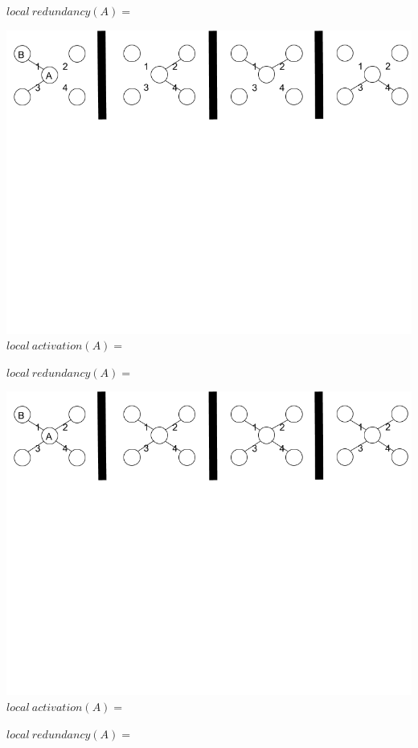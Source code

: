 \documentclass[oneside,12pt]{Classes/RoboticsLaTeX}
\begin{document}
\begin{appendices}
\begin{center}
$local\ redundancy(A) =$
\end{center}
\begin{center}
\includegraphics[trim={0 15cm 0 0}, width=140mm]{./Figures/volatilityAppendix3.png}
$local\ activation(A) =$

$local\ redundancy(A) =$
\end{center}
\begin{center}
\includegraphics[trim={0 15cm 0 0}, width=140mm]{./Figures/volatilityAppendix4.png}
$local\ activation(A) =$

$local\ redundancy(A) =$
\end{center}

\end{appendices}
\end{document}
